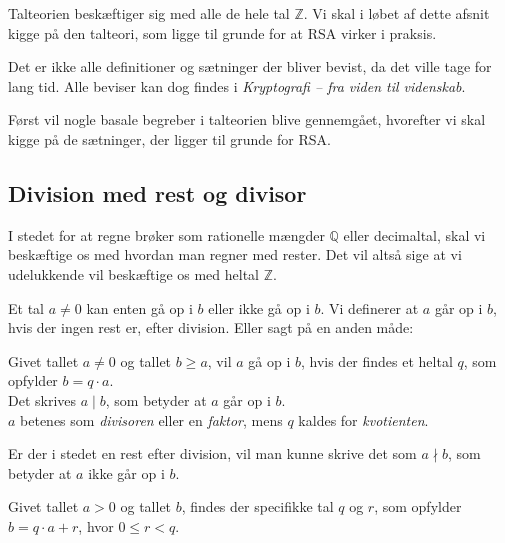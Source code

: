 

Talteorien beskæftiger sig med alle de hele tal \(\mathbb{Z}\).
Vi skal i løbet af dette afsnit kigge på den talteori, som ligge til grunde for at RSA virker i praksis.

Det er ikke alle definitioner og sætninger der bliver bevist, da det ville tage for lang tid.
Alle beviser kan dog findes i \textit{Kryptografi -- fra viden til videnskab}. \cite{krypto}
\par
Først vil nogle basale begreber i talteorien blive gennemgået, hvorefter vi skal kigge på de sætninger, der ligger til grunde for RSA.

\subsection{Division med rest og divisor}
I stedet for at regne brøker som rationelle mængder \(\mathbb{Q}\) eller decimaltal, skal vi beskæftige os med hvordan man regner med rester.
Det vil altså sige at vi udelukkende vil beskæftige os med heltal \(\mathbb{Z}\).

Et tal \(a \neq 0\) kan enten gå op i \(b\) eller ikke gå op i \(b\).
Vi definerer at \(a\) går op i \(b\), hvis der ingen rest er, efter division. Eller sagt på en anden måde:


\begin{definition}
    \label{heldiv}
    Givet tallet \(a \neq 0\) og tallet \(b \geq a\), vil \(a\) gå op i \(b\),
    hvis der findes et heltal \(q\), som opfylder \(b = q \cdot a\).\\
    Det skrives \(a \mid b\), som betyder at \(a\) går op i \(b\).\\
    \(a\) betenes som \textit{divisoren} eller en \textit{faktor},
    mens \(q\) kaldes for \textit{kvotienten}.\cite[70]{krypto}
\end{definition}

Er der i stedet en rest efter division, vil man kunne skrive det som \(a \nmid b\), som betyder at \(a\) ikke går op i \(b\).

\begin{sent}
    \label{rest}
    Givet tallet \(a > 0\) og tallet \(b\), findes der specifikke tal \(q\) og \(r\), som opfylder \(b = q \cdot a + r\), hvor \(0 \leq r < q\). %
\end{sent}



